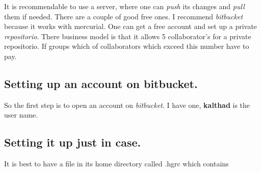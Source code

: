 \documentclass[11pt]{article}
\begin{document}
It is recommendable to use a server, where one can \emph{push} its changes
and \emph{pull} them if needed. There are a couple of good free ones. I
recommend \emph{bitbucket} because it works with mercurial. One can get a
free account and set up a private \emph{repositorio}. There business model
is that it allows 5 collaborator's for a private repositorio. If
groups which of collaborators which exceed this number have to pay. 

\subsection{Setting up an account on bitbucket.}
\label{sec:orgheadline10}

So the first step is to open an account on \emph{bitbucket}. I have one,
\textbf{kalthad} is the user name.

\subsection{Setting it up just in case.}
\label{sec:orgheadline11}

It is best to have a file in its home directory called .hgrc which
contains
\end{document}
